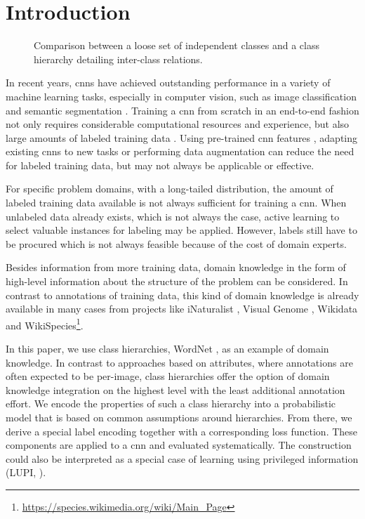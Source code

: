 \documentclass[10pt,twocolumn,letterpaper]{article}
\begin{document}
\section{Introduction}
\begin{figure*}[t]
  \begin{center}
  \caption{Comparison between a loose set of independent classes and a class hierarchy detailing inter-class relations.}
  \label{fig:teaser}
  \end{center}
\end{figure*}

In recent years, \glspl{cnn} have achieved outstanding performance
in a variety of machine learning tasks, especially in computer vision, such as
image classification \cite{Krizhevsky2012CNN,He2015Res} and semantic segmentation \cite{Long2014FCN}.
Training a \gls{cnn} from scratch in an end-to-end fashion not only requires considerable
computational resources and experience, but also large amounts of labeled training data \cite{Sun2017Data}.
Using pre-trained \gls{cnn} features \cite{Razavian2014Features}, adapting
existing \glspl{cnn} to new tasks \cite{Hoffman2014LSDA} or performing data augmentation
can reduce the need for
labeled training data, but may not always be applicable or effective.

For specific problem domains, \eg with a long-tailed distribution, the amount of labeled training
data available is not always sufficient for training a \gls{cnn}.
When unlabeled data already exists, which is not always the case,
active learning \cite{Settles2009ALS}
to select valuable instances for labeling may be applied.
However, labels still have to be procured which is not always feasible
because of the cost of domain experts.

Besides information from more training data, domain knowledge in the form of high-level information about the structure
of the problem can be considered. In contrast to annotations of training data, this kind of domain knowledge is already available
in many cases from projects like
iNaturalist \cite{VanHorn2017iNat}, Visual Genome \cite{Krishna2017VG}, Wikidata \cite{Vrandevcic2014Wikidata}
and WikiSpecies\footnote{\url{https://species.wikimedia.org/wiki/Main_Page}}.

In this paper, we use class hierarchies, \eg WordNet \cite{Fellbaum1998WordNet}, as
an example of domain knowledge. In contrast to approaches based on attributes, where annotations
are often expected to be per-image, class hierarchies offer the option of domain knowledge integration on the highest level with the least additional annotation effort.
We encode the properties of such a class hierarchy into a probabilistic model that is based on common assumptions around hierarchies. From there, we derive a special label encoding together with a corresponding loss function.
These components are applied to a \gls{cnn} and evaluated systematically. The construction could also be interpreted as
a special case of learning using privileged information (LUPI, \cite{Vapnik2009LUPI}).
\end{document}
